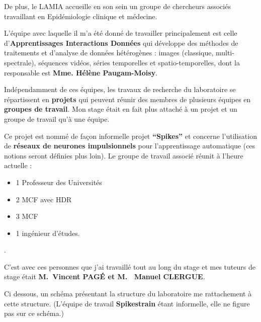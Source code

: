 De plus, le LAMIA accueille en son sein un groupe de chercheurs associés
travaillant en Epidémiologie clinique et médecine.

L'équipe avec laquelle il m'a été donné de travailler principalement est
celle d'\textbf{Apprentissages Interactions Données} qui développe des
méthodes de traitements et d'analyse de données hétérogènes : images
(classique, multi-spectrale), séquences vidéos, séries temporelles et
spatio-temporelles, dont la responsable est \textbf{Mme. Hélène
Paugam-Moisy}.

Indépendamment de ces équipes, les travaux de recherche du laboratoire
se répartissent en \textbf{projets} qui peuvent réunir des membres de
plusieurs équipes en \textbf{groupes de travail}. Mon stage était en
fait plus attaché à un projet et un groupe de travail qu'à une équipe.

Ce projet est nommé de façon informelle projet \textbf{``Spikes''} et
concerne l'utilisation de \textbf{réseaux de neurones impulsionnels}
pour l'apprentissage automatique (ces notions seront définies plus
loin). Le groupe de travail associé réunit à l'heure actuelle :

\begin{itemize}
\tightlist
\item
  1 Professeur des Universités
\item
  2 MCF avec HDR
\item
  3 MCF
\item
  1 ingénieur d'études.
\end{itemize}.

C'est avec ces personnes que j'ai travaillé tout au long du stage et mes
tuteurs de stage était \textbf{M.~Vincent PAGÉ et M. ~Manuel CLERGUE}.

Ci dessous, un schéma présentant la structure du laboratoire me
rattachement à cette structure. (L'équipe de travail \textbf{Spikestrain}
étant informelle, elle ne figure pas sur ce schéma.)

